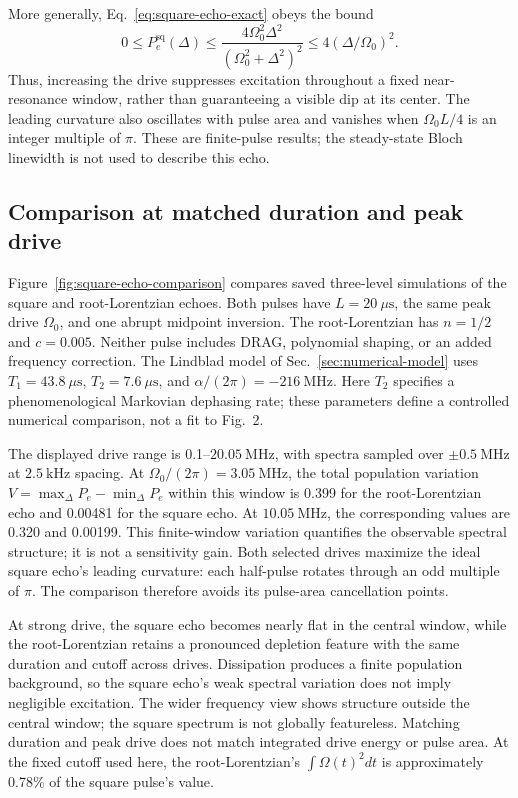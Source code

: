 More generally, Eq.~\eqref{eq:square-echo-exact} obeys the bound
\begin{equation}
    0\leq P_e^{\mathrm{sq}}(\Delta)
      \leq\frac{4\Omega_0^2\Delta^2}{(\Omega_0^2+\Delta^2)^2}
      \leq4(\Delta/\Omega_0)^2.
    \label{eq:square-echo-bound}
\end{equation}
Thus, increasing the drive suppresses excitation throughout a fixed
near-resonance window, rather than guaranteeing a visible dip at its center.
The leading curvature also oscillates with pulse area and vanishes when
$\Omega_0 L/4$ is an integer multiple of $\pi$. These are finite-pulse
results; the steady-state Bloch linewidth is not used to describe this echo.

\subsection{Comparison at matched duration and peak drive}

Figure~\ref{fig:square-echo-comparison} compares saved three-level simulations
of the square and root-Lorentzian echoes. Both pulses have $L=20~\mu\mathrm{s}$,
the same peak drive $\Omega_0$, and one abrupt midpoint inversion. The
root-Lorentzian has $n=1/2$ and $c=0.005$. Neither pulse includes DRAG,
polynomial shaping, or an added frequency correction. The Lindblad model
of Sec.~\ref{sec:numerical-model} uses $T_1=43.8~\mu\mathrm{s}$,
$T_2=7.6~\mu\mathrm{s}$, and $\alpha/(2\pi)=-216~\mathrm{MHz}$.
Here $T_2$ specifies a phenomenological Markovian dephasing rate; these
parameters define a controlled numerical comparison, not a fit to Fig.~2.

The displayed drive range is 0.1--$20.05~\mathrm{MHz}$, with spectra sampled
over $\pm0.5~\mathrm{MHz}$ at $2.5~\mathrm{kHz}$ spacing. At
$\Omega_0/(2\pi)=3.05~\mathrm{MHz}$, the total population variation
$V=\max_\Delta P_e-\min_\Delta P_e$ within this window is 0.399 for the
root-Lorentzian echo and 0.00481 for the square echo. At $10.05~\mathrm{MHz}$,
the corresponding values are 0.320 and 0.00199. This finite-window variation
quantifies the observable spectral structure; it is not a sensitivity gain.
Both selected drives maximize the ideal square echo's leading curvature:
each half-pulse rotates through an odd multiple of $\pi$. The comparison
therefore avoids its pulse-area cancellation points.

At strong drive, the square echo becomes nearly flat in the central window, while the
root-Lorentzian retains a pronounced depletion feature with the same duration
and cutoff across drives. Dissipation produces a finite population background,
so the square echo's weak spectral variation does not imply negligible
excitation. The wider frequency view shows structure outside
the central window; the square spectrum is not globally featureless.
Matching duration and peak drive does not match integrated drive energy
or pulse area. At the fixed cutoff used here, the root-Lorentzian's
$\int\Omega(t)^2dt$ is approximately 0.78\% of the square pulse's value.

